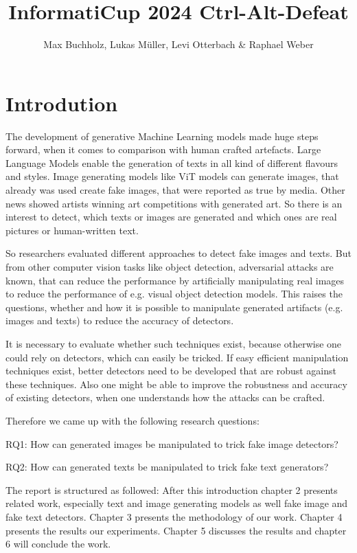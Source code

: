 \documentclass{article} %
\title{InformatiCup 2024 Ctrl-Alt-Defeat}
\author{Max Buchholz, Lukas Müller, Levi Otterbach \& Raphael Weber}
\begin{document}
\maketitle

\begin{abstract}

\end{abstract}

\section{Introdution}
The development of generative Machine Learning models made huge steps forward, when it comes to comparison with human crafted artefacts. Large Language Models enable the generation of texts in all kind of different flavours and styles. Image generating models like ViT models can generate images, that already was used create fake images, that were reported as true by media. Other news showed artists winning art competitions with generated art. So there is an interest to detect, which texts or images are generated and which ones are real pictures or human-written text.


So researchers evaluated different approaches to detect fake images and texts. But from other computer vision tasks like object detection, adversarial attacks are known, that can reduce the performance by artificially manipulating real images to reduce the performance of e.g. visual object detection models. This raises the questions, whether and how it is possible to manipulate generated artifacts (e.g. images and texts) to reduce the accuracy of detectors.


It is necessary to evaluate whether such techniques exist, because otherwise one could rely on detectors, which can easily be tricked. If easy efficient manipulation techniques exist, better detectors need to be developed that are robust against these techniques. Also one might be able to improve the robustness and accuracy of existing detectors, when one understands how the attacks can be crafted.

Therefore we came up with the following research questions:


RQ1: How can generated images be manipulated to trick fake image detectors?


RQ2: How can generated texts be manipulated to trick fake text generators?


The report is structured as followed: After this introduction chapter 2 presents related work, especially text and image generating models as well  fake image and fake text detectors. Chapter 3 presents the methodology of our work. Chapter 4 presents the results our experiments. Chapter 5 discusses the results and chapter 6 will conclude the work.
\end{document}
